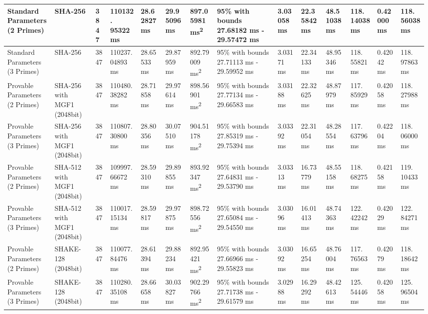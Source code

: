 \documentclass[]{final_report}
\theoremstyle{definition}
\begin{document}
\begin{landscape}
\begin{longtable}{|p{2.3cm}|p{1.8cm}|p{1.0cm}|p{1.7cm}|p{1.4cm}|p{1.5cm}|p{1.8cm}|p{1.5cm}|p{1.2cm}|p{1.5cm}|p{1.3cm}|p{1.2cm}|p{1.3cm}|p{1.3cm}|}
\hline
\endlastfoot
Standard Parameters (2 Primes) & SHA-256 & 3847 & 110132.
95322 ms & 28.62827 ms & 29.95096 ms & 897.05981 ms\textsuperscript{2} & 95\% with bounds 27.68182 ms - 29.57472 ms & 3.03058 ms & 22.35842 ms & 48.51038 ms & 118.
14038 ms & 0.42000 ms & 118.
56038 ms &  \\
\hline
Standard Parameters (3 Primes) & SHA-256 & 3847 & 110237.
04893 ms & 28.65533 ms & 29.87959 ms & 892.79009 ms\textsuperscript{2} & 95\% with bounds 27.71113 ms - 29.59952 ms & 3.03171 ms & 22.34133 ms & 48.95346 ms & 118.
55821 ms & 0.42042 ms & 118.
97863 ms &  \\
\hline
Provable Parameters (2 Primes) & SHA-256 with MGF1 (2048bit) & 3847 & 110480.
38282 ms & 28.71858 ms & 29.97614 ms & 898.56901 ms\textsuperscript{2} & 95\% with bounds 27.77134 ms - 29.66583 ms & 3.03188 ms & 22.32625 ms & 48.87979 ms & 117.
85929 ms & 0.42058 ms & 118.
27988 ms  \\
\hline
Provable Parameters (3 Primes) & SHA-256 with MGF1 (2048bit) & 3847 & 110807.
30800 ms & 28.80356 ms & 30.07510 ms & 904.51178 ms\textsuperscript{2} & 95\% with bounds 27.85319 ms - 29.75394 ms & 3.03392 ms & 22.31054 ms & 48.28554 ms & 117.
63796 ms & 0.42204 ms & 118.
06000 ms  \\
\hline
Provable Parameters (2 Primes) & SHA-512 with MGF1 (2048bit) & 3847 & 109997.
66672 ms & 28.59310 ms & 29.89855 ms & 893.92347 ms\textsuperscript{2} & 95\% with bounds 27.64831 ms - 29.53790 ms & 3.03313 ms & 16.73779 ms & 48.55158 ms & 118.
68275 ms & 0.42158 ms & 119.
10433 ms &  \\
\hline
Provable Parameters (3 Primes) & SHA-512 with MGF1 (2048bit) & 3847 & 110017.
15134 ms & 28.59817 ms & 29.97875 ms & 898.72556 ms\textsuperscript{2} & 95\% with bounds 27.65084 ms - 29.54550 ms & 3.03096 ms & 16.01413 ms & 48.74363 ms & 122.
42242 ms & 0.42029 ms & 122.
84271 ms \\
\hline
Provable Parameters (2 Primes) & SHAKE-128 (2048bit) & 3847 & 110077.
84476 ms & 28.61394 ms & 29.88234 ms & 892.95421 ms\textsuperscript{2} & 95\% with bounds 27.66966 ms - 29.55823 ms & 3.03092 ms & 16.65254 ms & 48.76004 ms & 117.
76563 ms & 0.42079 ms & 118.
18642 ms \\
\hline
Provable Parameters (3 Primes) & SHAKE-128 (2048bit) & 3847 & 110280.
35108 ms & 28.66658 ms & 30.03827 ms & 902.29766 ms\textsuperscript{2} & 95\% with bounds 27.71738 ms - 29.61579 ms & 3.02988 ms & 16.29292 ms & 48.42613 ms & 125.
54446 ms & 0.42058 ms & 125.
96504 ms  \\

\end{longtable}
\end{landscape}
\end{document}
